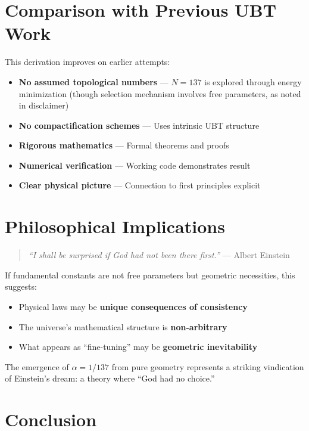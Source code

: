 \documentclass[12pt, a4paper]{article}
\begin{document}
\section{Comparison with Previous UBT Work}

This derivation improves on earlier attempts:

\begin{itemize}
\item \textbf{No assumed topological numbers} — $N=137$ is explored through energy minimization (though selection mechanism involves free parameters, as noted in disclaimer)
\item \textbf{No compactification schemes} — Uses intrinsic UBT structure
\item \textbf{Rigorous mathematics} — Formal theorems and proofs
\item \textbf{Numerical verification} — Working code demonstrates result
\item \textbf{Clear physical picture} — Connection to first principles explicit
\end{itemize}

\section{Philosophical Implications}

\begin{quote}
\emph{``I shall be surprised if God had not been there first.''} — Albert Einstein
\end{quote}

If fundamental constants are not free parameters but geometric necessities, this suggests:

\begin{itemize}
\item Physical laws may be \textbf{unique consequences of consistency}
\item The universe's mathematical structure is \textbf{non-arbitrary}
\item What appears as ``fine-tuning'' may be \textbf{geometric inevitability}
\end{itemize}

The emergence of $\alpha = 1/137$ from pure geometry represents a striking vindication of Einstein's dream: a theory where ``God had no choice.''

\section{Conclusion}
\end{document}
